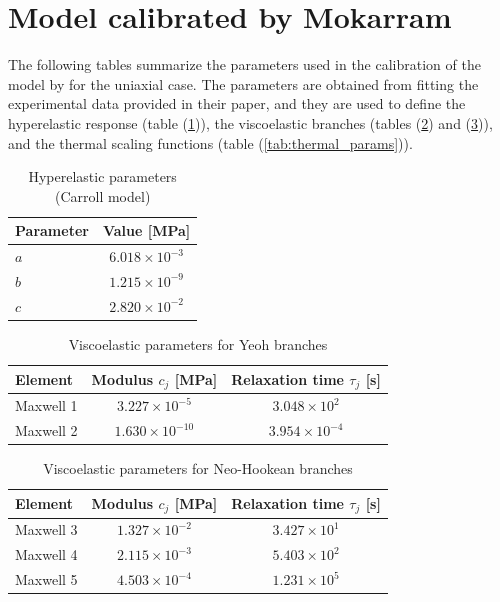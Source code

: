 \documentclass[a4paper,12pt]{article}
\newcommand{\0}{\mathbf{0}}
\begin{document}
\section{Model calibrated by Mokarram}

The following tables summarize the parameters used in the calibration of the model by \cite{mokarram2020} for the uniaxial case. The parameters are obtained from fitting the experimental data provided in their paper, and they are used to define the hyperelastic response (table (\ref{tab:carroll_params})), the viscoelastic branches (tables (\ref{tab:yeoh_viscous}) and (\ref{tab:neoh_viscous})), and the thermal scaling functions (table (\ref{tab:thermal_params})).

\begin{table}[ht]
\centering
\caption{Hyperelastic parameters (Carroll model)}
\label{tab:carroll_params}
\begin{tabular}{lc}
\hline
Parameter & Value [MPa] \\ \hline
$a$       & $6.018 \times 10^{-3}$ \\
$b$       & $1.215 \times 10^{-9}$ \\
$c$       & $2.820 \times 10^{-2}$ \\ \hline
\end{tabular}
\end{table}

\begin{table}[ht]
\centering
\caption{Viscoelastic parameters for Yeoh branches}
\label{tab:yeoh_viscous}
\begin{tabular}{lcc}
\hline
Element   & Modulus $c_j$ [MPa]      & Relaxation time $\tau_j$ [s] \\ \hline
Maxwell 1 & $3.227 \times 10^{-5}$  & $3.048 \times 10^{2}$        \\
Maxwell 2 & $1.630 \times 10^{-10}$ & $3.954 \times 10^{-4}$       \\ \hline
\end{tabular}
\end{table}

\begin{table}[ht]
\centering
\caption{Viscoelastic parameters for Neo-Hookean branches}
\label{tab:neoh_viscous}
\begin{tabular}{lcc}
\hline
Element   & Modulus $c_j$ [MPa]     & Relaxation time $\tau_j$ [s] \\ \hline
Maxwell 3 & $1.327 \times 10^{-2}$ & $3.427 \times 10^{1}$        \\
Maxwell 4 & $2.115 \times 10^{-3}$ & $5.403 \times 10^{2}$        \\
Maxwell 5 & $4.503 \times 10^{-4}$ & $1.231 \times 10^{5}$        \\ \hline
\end{tabular}
\end{table}
\end{document}
